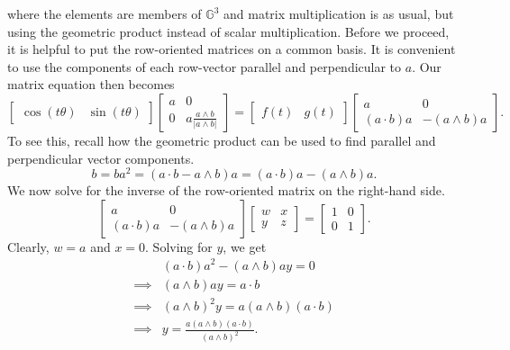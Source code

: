 \documentclass{article}
\newcommand{\G}{\mathbb{G}}
\begin{document}
where the elements are members of $\G^3$ and matrix multiplication
is as usual, but using the geometric product instead of scalar multiplication.
Before we proceed, it is helpful to put the row-oriented matrices on a common basis.
It is convenient to use the components of each row-vector
parallel and perpendicular to $a$.  Our matrix equation then becomes
\begin{equation*}
\left[\begin{array}{cc}\cos(t\theta)&\sin(t\theta)\end{array}\right]
\left[\begin{array}{cc}a&0\\0&a\frac{a\wedge b}{|a\wedge b|}\end{array}\right]
=\left[\begin{array}{cc}f(t)&g(t)\end{array}\right]
\left[\begin{array}{cc}a&0\\(a\cdot b)a&-(a\wedge b)a\end{array}\right].
\end{equation*}
To see this, recall how the geometric product can be used to find parallel
and perpendicular vector components.
\begin{equation*}
b = ba^2 = (a\cdot b-a\wedge b)a = (a\cdot b)a - (a\wedge b)a.
\end{equation*}
We now solve for the inverse of the row-oriented matrix on the right-hand side.
\begin{equation*}
\left[\begin{array}{cc}a&0\\(a\cdot b)a&-(a\wedge b)a\end{array}\right]
\left[\begin{array}{cc}w&x\\y&z\end{array}\right] =
\left[\begin{array}{cc}1&0\\0&1\end{array}\right].
\end{equation*}
Clearly, $w=a$ and $x=0$.
Solving for $y$, we get
\begin{align*}
 & (a\cdot b)a^2-(a\wedge b)ay = 0 \\
\implies& (a\wedge b)ay = a\cdot b \\
\implies& (a\wedge b)^2y = a(a\wedge b)(a\cdot b) \\
\implies& y = \frac{a(a\wedge b)(a\cdot b)}{(a\wedge b)^2}.
\end{align*}
\end{document}
